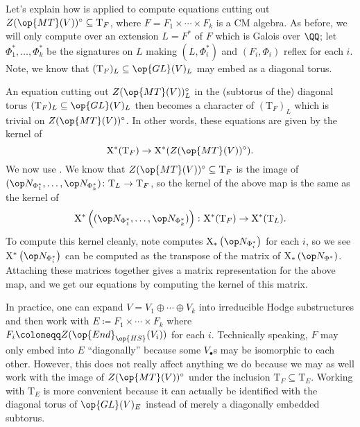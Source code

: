 \documentclass[../thesis.tex]{subfiles}
\begin{document}
Let's explain how  is applied to compute equations cutting out $Z(\op{MT}(V))^\circ\subseteq\mathrm T_F$, where $F=F_1\times\cdots\times F_k$ is a CM algebra. As before, we will only compute over an extension $L=F^*$ of $F$ which is Galois over $\QQ$; let $\Phi^*_1,\ldots,\Phi_k^*$ be the signatures on $L$ making $(L,\Phi^*_i)$ and $(F_i,\Phi_i)$ reflex for each $i$. Note, we know that $(\mathrm T_F)_L\subseteq\op{GL}(V)_L$ may embed as a diagonal torus.

An equation cutting out $Z(\op{MT}(V))^\circ_L$ in the (subtorus of the) diagonal torus $(\mathrm T_F)_L\subseteq\op{GL}(V)_L$ then becomes a character of $(\mathrm T_F)_L$ which is trivial on $Z(\op{MT}(V))^\circ$. In other words, these equations are given by the kernel of
\[\mathrm X^*(\mathrm T_F)\to\mathrm X^*(Z(\op{MT}(V))^\circ).\]
We now use . We know that $Z(\op{MT}(V))^\circ\subseteq\mathrm T_F$ is the image of $({\op N_{\Phi^*_1}},\ldots,{\op N_{\Phi_k^*}})\colon\mathrm T_L\to\mathrm T_F$, so the kernel of the above map is the same as the kernel of
\[\mathrm X^*\left(({\op N_{\Phi^*_1}},\ldots,{\op N_{\Phi_k^*}})\right)\colon\mathrm X^*(\mathrm T_F)\to\mathrm X^*(\mathrm T_L).\]
To compute this kernel cleanly, note  computes $\mathrm X_*\left(\op N_{\Phi_i^*}\right)$ for each $i$, so we see $\mathrm X^*\left(\op N_{\Phi^*_i}\right)$ can be computed as the transpose of the matrix of $\mathrm X_*\left(\op N_{\Phi^*}\right)$. Attaching these matrices together gives a matrix representation for the above map, and we get our equations by computing the kernel of this matrix.
\begin{remark}
	In practice, one can expand $V=V_1\oplus\cdots\oplus V_k$ into irreducible Hodge substructures and then work with $E\coloneqq F_1\times\cdots\times F_k$ where $F_i\coloneqq Z(\op{End}_{\op{HS}}(V_i))$ for each $i$. Technically speaking, $F$ may only embed into $E$ ``diagonally'' because some $V_\bullet$s may be isomorphic to each other. However, this does not really affect anything we do because we may as well work with the image of $Z(\op{MT}(V))^\circ$ under the inclusion $\mathrm T_F\subseteq\mathrm T_E$. Working with $\mathrm T_E$ is more convenient because it can actually be identified with the diagonal torus of $\op{GL}(V)_E$ instead of merely a diagonally embedded subtorus.
\end{remark}
\end{document}
